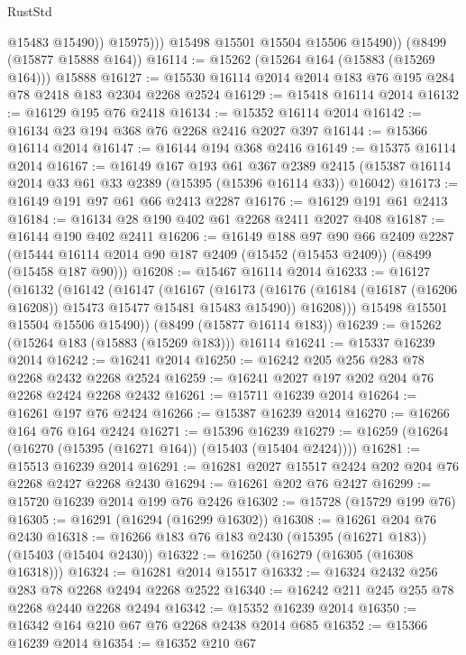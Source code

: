 \begin{lexlean}{RustStd}
\begin{coremodule}
                  @15483
                  @15490))
              @15975)))
        @15498
        @15501
        @15504
        @15506
        @15490))
    (@8499 (@15877 @15888 @164))
@16114 := @15262 (@15264 @164 (@15883 (@15269 @164))) @15888
@16127 := @15530 @16114 @2014 @2014 @183 @76 @195 @284 @78 @2418 @183 @2304 @2268 @2524
@16129 := @15418 @16114 @2014
@16132 := @16129 @195 @76 @2418
@16134 := @15352 @16114 @2014
@16142 := @16134 @23 @194 @368 @76 @2268 @2416 @2027 @397
@16144 := @15366 @16114 @2014
@16147 := @16144 @194 @368 @2416
@16149 := @15375 @16114 @2014
@16167 := @16149
    @167
    @193
    @61
    @367
    @2389
    @2415
    (@15387 @16114 @2014 @33 @61 @33 @2389 (@15395 (@15396 @16114 @33)) @16042)
@16173 := @16149 @191 @97 @61 @66 @2413 @2287
@16176 := @16129 @191 @61 @2413
@16184 := @16134 @28 @190 @402 @61 @2268 @2411 @2027 @408
@16187 := @16144 @190 @402 @2411
@16206 := @16149
    @188
    @97
    @90
    @66
    @2409
    @2287
    (@15444 @16114 @2014 @90 @187 @2409 (@15452 (@15453 @2409)) (@8499 (@15458 @187 @90)))
@16208 := @15467 @16114 @2014
@16233 := @16127
    (@16132
      (@16142
        (@16147
          (@16167
            (@16173
              (@16176 (@16184 (@16187 (@16206 @16208)) @15473 @15477 @15481 @15483 @15490))
              @16208)))
        @15498
        @15501
        @15504
        @15506
        @15490))
    (@8499 (@15877 @16114 @183))
@16239 := @15262 (@15264 @183 (@15883 (@15269 @183))) @16114
@16241 := @15337 @16239 @2014
@16242 := @16241 @2014
@16250 := @16242 @205 @256 @283 @78 @2268 @2432 @2268 @2524
@16259 := @16241 @2027 @197 @202 @204 @76 @2268 @2424 @2268 @2432
@16261 := @15711 @16239 @2014
@16264 := @16261 @197 @76 @2424
@16266 := @15387 @16239 @2014
@16270 := @16266 @164 @76 @164 @2424
@16271 := @15396 @16239
@16279 := @16259 (@16264 (@16270 (@15395 (@16271 @164)) (@15403 (@15404 @2424))))
@16281 := @15513 @16239 @2014
@16291 := @16281 @2027 @15517 @2424 @202 @204 @76 @2268 @2427 @2268 @2430
@16294 := @16261 @202 @76 @2427
@16299 := @15720 @16239 @2014 @199 @76 @2426
@16302 := @15728 (@15729 @199 @76)
@16305 := @16291 (@16294 (@16299 @16302))
@16308 := @16261 @204 @76 @2430
@16318 := @16266 @183 @76 @183 @2430 (@15395 (@16271 @183)) (@15403 (@15404 @2430))
@16322 := @16250 (@16279 (@16305 (@16308 @16318)))
@16324 := @16281 @2014 @15517
@16332 := @16324 @2432 @256 @283 @78 @2268 @2494 @2268 @2522
@16340 := @16242 @211 @245 @255 @78 @2268 @2440 @2268 @2494
@16342 := @15352 @16239 @2014
@16350 := @16342 @164 @210 @67 @76 @2268 @2438 @2014 @685
@16352 := @15366 @16239 @2014
@16354 := @16352 @210 @67

\end{coremodule}
\end{lexlean}
